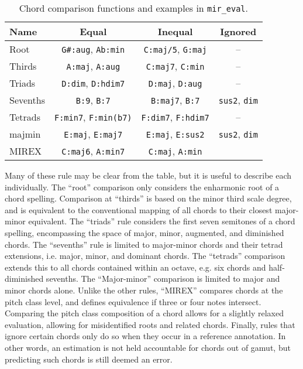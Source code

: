 \begin{table}[t]
\begin{center}
\caption{Chord comparison functions and examples in \texttt{mir\_eval}.}
\label{tab:mir_eval}
\begin{tabular}{l | c | c | c }
Name & Equal & Inequal & Ignored \\
\hline
Root & \texttt{G\#:aug}, \texttt{Ab:min} & \texttt{C:maj/5}, \texttt{G:maj} & -- \\
Thirds & \texttt{A:maj}, \texttt{A:aug} & \texttt{C:maj7}, \texttt{C:min} & --\\
Triads & \texttt{D:dim}, \texttt{D:hdim7} & \texttt{D:maj}, \texttt{D:aug} & -- \\
Sevenths & \texttt{B:9}, \texttt{B:7} & \texttt{B:maj7}, \texttt{B:7} & \texttt{sus2}, \texttt{dim} \\
Tetrads & \texttt{F:min7}, \texttt{F:min(b7)} & \texttt{F:dim7}, \texttt{F:hdim7} & -- \\
majmin & \texttt{E:maj}, \texttt{E:maj7} & \texttt{E:maj}, \texttt{E:sus2} & \texttt{sus2}, \texttt{dim} \\
MIREX & \texttt{C:maj6}, \texttt{A:min7} & \texttt{C:maj}, \texttt{A:min} \\
\hline
\end{tabular}
\end{center}
\end{table}

Many of these rule may be clear from the table, but it is useful to describe each individually.
The ``root'' comparison only considers the enharmonic root of a chord spelling.
Comparison at ``thirds'' is based on the minor third scale degree, and is equivalent to the conventional mapping of all chords to their closest major-minor equivalent.
The ``triads'' rule considers the first seven semitones of a chord spelling, encompassing the space of major, minor, augmented, and diminished chords.
The ``sevenths'' rule is limited to major-minor chords and their tetrad extensions, i.e. major, minor, and dominant chords.
The ``tetrads'' comparison extends this to all chords contained within an octave, e.g. six chords and half-diminished sevenths.
The ``Major-minor'' comparison is limited to major and minor chords alone.
Unlike the other rules, ``MIREX'' compares chords at the pitch class level, and defines equivalence if three or four notes intersect.
Comparing the pitch class composition of a chord allows for a slightly relaxed evaluation, allowing for misidentified roots and related chords.
Finally, rules that ignore certain chords only do so when they occur in a reference annotation.
In other words, an estimation is not held accountable for chords out of gamut, but predicting such chords is still deemed an error.

